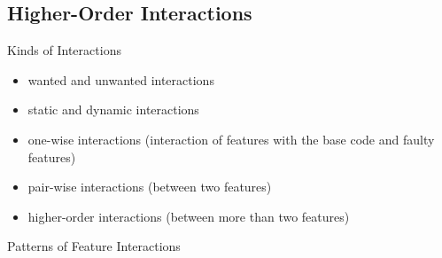 \subsection{Higher-Order Interactions}
\begin{frame}{\myframetitle}
	\begin{fancycolumns}
		\begin{definition}{Kinds of Interactions}
			\begin{itemize}
				\item wanted and unwanted interactions
				\item static and dynamic interactions
				\item one-wise interactions (interaction of features with the base code and faulty features)
				\item pair-wise interactions (between two features)
				\item higher-order interactions (between more than two features)
			\end{itemize}
		\end{definition}
	\nextcolumn
		\begin{exampletight}{Patterns of Feature Interactions\mysource{\VBDb}}
		\end{exampletight}
	\end{fancycolumns}
\end{frame}


